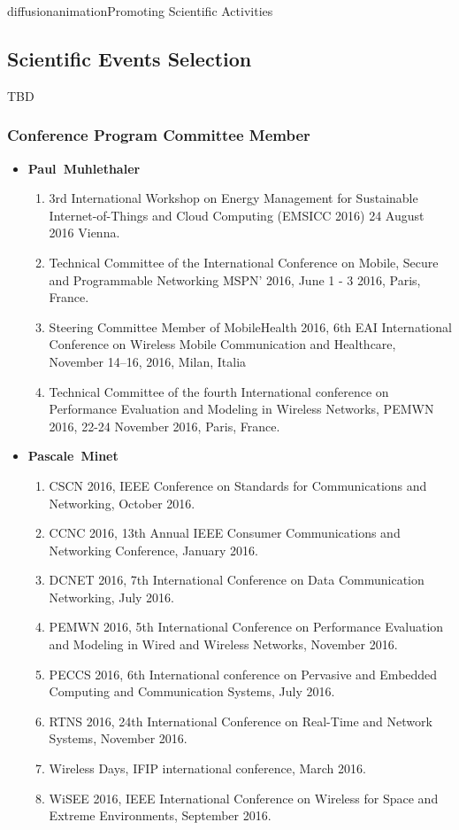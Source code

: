 \documentclass{ra2016}
\newcommand{\paul}             {\textbf{Paul~Muhlethaler}}
\newcommand{\pascale}          {\textbf{Pascale~Minet}}
\begin{document}
\begin{module}{diffusion}{animation}{Promoting Scientific Activities}
    
\subsection {Scientific Events Selection}

TBD 

 \subsubsection {Conference Program Committee Member}

\begin{itemize}
    \item \paul
        \begin{enumerate}
             \item 3rd International Workshop on Energy Management for Sustainable Internet-of-Things and Cloud Computing (EMSICC 2016) 24 August 2016 Vienna. 
             \item Technical Committee of the International Conference on Mobile, Secure and Programmable Networking MSPN' 2016, June 1 - 3 2016, Paris, France. 
            \item Steering Committee Member of MobileHealth 2016, 6th  EAI International Conference on Wireless Mobile Communication and Healthcare,  November 14–16, 2016, Milan, Italia   
            \item Technical Committee of the fourth International conference on Performance Evaluation and Modeling in Wireless Networks, PEMWN 2016, 22-24 November 2016, Paris, France. 
        \end{enumerate}
    \item \pascale
        \begin{enumerate}
        \item CSCN 2016,  IEEE  Conference on Standards for Communications and Networking, October 2016.
        \item CCNC 2016, 13th Annual IEEE Consumer Communications and Networking Conference, January 2016.
        \item DCNET 2016, 7th International Conference on Data Communication Networking, July 2016.
        \item PEMWN 2016, 5th International Conference on Performance Evaluation and Modeling in Wired and Wireless Networks, November 2016.
       \item PECCS 2016, 6th International conference on Pervasive and Embedded Computing and Communication Systems, July 2016.
       \item RTNS 2016, 24th International Conference on Real-Time and Network Systems, November 2016.
       \item Wireless Days, IFIP international conference, March 2016.
\item WiSEE 2016, IEEE International Conference on Wireless for Space and Extreme Environments, September 2016.
          \end{enumerate}
        

\end{itemize}
\end{module}
\end{document}
